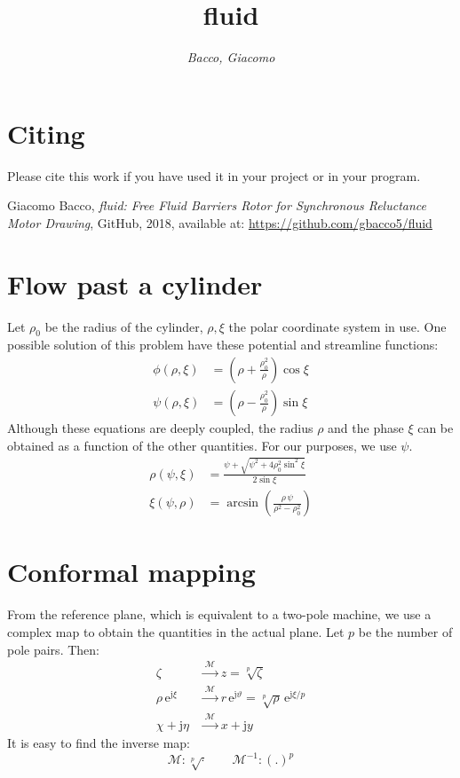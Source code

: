 \documentclass[b5paper,11pt,oneside,fleqn]{article}
\title{\raggedleft\sffamily\Huge fluid}
\author{\sffamily\itshape Bacco, Giacomo}
\date{}
\newcommand{\eu}{\mathrm{e}}
\newcommand{\je}{\mathrm{j}}
\newcommand{\te}{\vartheta}
\begin{document}
\maketitle


\section*{Citing}
Please cite this work if you have used it in your project or in your program.
\vspace{0\baselineskip}

{\small\noindent%
Giacomo Bacco, \emph{fluid: Free Fluid Barriers Rotor for Synchronous 
Reluctance Motor Drawing}, GitHub, 2018, available at: 
\url{https://github.com/gbacco5/fluid}
}

\section{Flow past a cylinder}

Let $ \rho_0 $ be the radius of the cylinder, $ \rho,\xi $ the polar coordinate 
system in use.
One possible solution of this problem have these potential and streamline 
functions:
\begin{align}
\phi(\rho,\xi) &= \left( \rho + \frac{\rho_0^2}{\rho} \right) \cos\xi \\[1ex]
\psi(\rho,\xi) &= \left( \rho - \frac{\rho_0^2}{\rho} \right) \sin\xi 
\end{align}
Although these equations are deeply coupled, the radius $ \rho $ and the phase 
$ \xi $ can be obtained as a function of the other quantities.
For our purposes, we use $ \psi $.
\begin{align}
\rho(\psi,\xi) &= \frac{\psi + \sqrt{\psi^2 + 4\rho_0^2 \sin^2\xi}}{2\sin\xi} 
\\[1ex]
\xi(\psi,\rho) &= \arcsin \left( \frac{\rho\, \psi}{\rho^2 - \rho_0^2} \right)  
\end{align}



\section{Conformal mapping}
From the reference plane, which is equivalent to a two-pole machine,
we use a complex map to obtain the quantities in the actual plane.
Let $ p $ be the number of pole pairs. Then:
\begin{equation}
\begin{aligned}
\zeta              &\xrightarrow{\;\mathcal{M}\;} z = \sqrt[p]{\zeta} \\
\rho\,\eu^{\je\xi} &\xrightarrow{\;\mathcal{M}\;}
                       r \, \eu^{\je\te} = \sqrt[p]{\rho}\,\eu^{\je 
                       \xi/p} \\
\chi + \je\eta     &\xrightarrow{\;\mathcal{M}\;} x + \je y 
\end{aligned}
\end{equation}
%
It is easy to find the inverse map:
\begin{equation}
\mathcal{M}\colon \sqrt[p]{\cdot} \qquad 
\mathcal{M}^{-1}\colon (.)^p
\end{equation}
\end{document}
